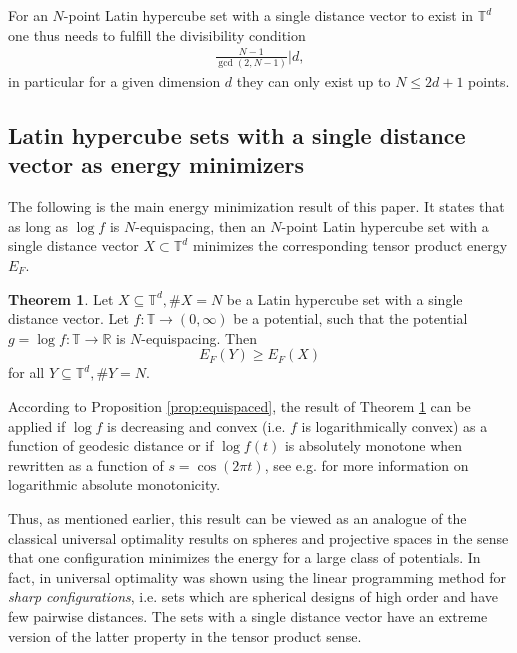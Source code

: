 \documentclass[a4paper,12pt]{article}
\numberwithin{equation}{section}
\theoremstyle{definition}
\newtheorem{thm}{Theorem}[section]
\newcommand{\bbR}{\mathbb{R}}
\newcommand{\bbT}{\mathbb{T}}
\newcommand{\sbse}{\subseteq}
\begin{document}
For an $N$-point Latin hypercube set with a single distance vector to exist in $\bbT^d$ one thus needs to fulfill the divisibility condition
\begin{align} \label{eq:div}
    \frac{N-1}{\gcd(2, N-1)} \bigg| d,
\end{align}
in particular for a given dimension $d$ they can only exist up to $N \leq 2d+1$ points.

\subsection{Latin hypercube sets with a single distance vector as energy minimizers}

The following is the main energy minimization result of this paper. It states  that as long as $\log f$ is $N$-equispacing, then an  $N$-point Latin hypercube set with a single distance vector  $X\subset \mathbb T^d$ minimizes  the corresponding tensor product energy $E_F$.

\begin{thm} \label{thm:optimality}
    Let $X \sbse \bbT^d, \#X = N$ be a Latin hypercube set with a single distance vector. Let $f: \bbT \rightarrow (0, \infty)$ be a potential, such that  the potential $g = \log f: \bbT \rightarrow \bbR$ is $N$-equispacing. Then %
    $$
    E_F(Y) \geq E_F(X)
    $$
    for all $Y \sbse \bbT^d, \#Y = N$.
\end{thm}

According to Proposition \ref{prop:equispaced}, the result of Theorem \ref{thm:optimality} can be applied  if $\log f$ is decreasing and  convex (i.e. $f$ is logarithmically convex)  as a function of geodesic distance or if $\log f (t)$ is absolutely monotone when  rewritten as a function of $s=\cos (2\pi t) $, see e.g. \cite{GQ10} for more information on logarithmic absolute monotonicity. %


Thus, as mentioned earlier, this result can be viewed as an analogue of the classical universal optimality results on spheres and projective spaces \cite{CK07, CKM16} in the sense that one configuration minimizes  the energy for a large class of potentials. In fact, in \cite{CK07} universal optimality was  shown  using the linear programming method for {\emph{sharp configurations}}, i.e. sets which are spherical designs of high order and have few pairwise distances. The sets with a single distance vector have an extreme version of the latter property in the tensor product sense. %
\end{document}
